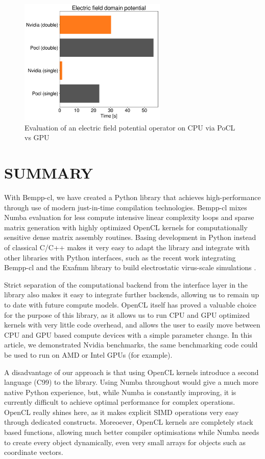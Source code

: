 \begin{figure}
	\center
	\includegraphics[width=7cm]{img/efield_domain_potential.pdf}
	\caption{Evaluation of an electric field potential operator on CPU via PoCL vs GPU}
	\label{fig:efield_domain_potential}
\end{figure}

\section{SUMMARY}
With Bempp-cl, we have created a Python library that achieves high-performance through use of modern just-in-time compilation technologies. Bempp-cl mixes Numba evaluation for less compute intensive linear complexity loops and sparse matrix generation with highly optimized OpenCL kernels for computationally sensitive dense matrix assembly routines. Basing development in Python instead of classical C/C++ makes it very easy to adapt the library and integrate with other libraries with Python interfaces, such as the recent work integrating Bempp-cl and the Exafmm library to build electrostatic virus-scale simulations \cite{bempp_exafmm}.

Strict separation of the computational backend from the interface layer in the library also makes it easy to integrate further backends, allowing us to remain up to date with future compute models. OpenCL itself has proved a valuable choice for the purpose of this library, as it allows us to run CPU and GPU optimized kernels with very little code overhead, and allows the user to easily move between CPU and GPU based compute devices with a simple parameter change. In this article, we demonstrated Nvidia benchmarks, the same benchmarking code could be used to run on AMD or Intel GPUs (for example).

A disadvantage of our approach is that using OpenCL kernels introduce a second language (C99) to the library. Using Numba throughout would give a much more native Python experience, but, while Numba is constantly improving, it is currently difficult to achieve optimal performance for complex operations. OpenCL really shines here, as it makes explicit SIMD operations very easy through dedicated constructs. Moreoever, OpenCL kernels are completely stack based functions, allowing much better compiler optimisations while Numba needs to create every object dynamically, even very small arrays for objects such as coordinate vectors.

